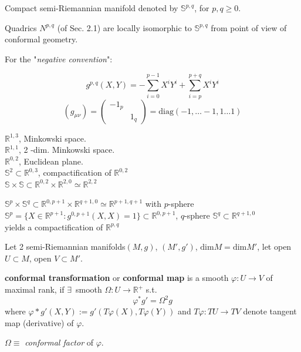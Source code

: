 Compact semi-Riemannian manifold denoted by $\mathbb{S}^{p,q}$, for $p, q\geq 0$.

Quadrics $N^{p,q}$ (of Sec. 2.1) are locally isomorphic to $\mathbb{S}^{p,q}$ from point of view of conformal geometry.

For the "\emph{negative convention}": 

\[
g^{p,q}(X,Y) = - \sum_{i=0}^{p-1} X^i Y^i + \sum_{i=p}^{p+q} X^i Y^i
\]
\[
(g_{\mu \nu}) = \left( \begin{matrix} -1_p & \\ & 1_q \end{matrix} \right) = \text{diag}(-1 , \dots - 1, 1 \dots 1)
\]

$\mathbb{R}^{1,3} $, Minkowski space. \\
$\mathbb{R}^{1,1}$, 2 -dim. Minkowski space. \\
$\mathbb{R}^{0,2}$, Euclidean plane. \\
$\mathbb{S}^2 \subset \mathbb{R}^{0,3}$, compactification of $\mathbb{R}^{0,2}$ \\
$\mathbb{S} \times \mathbb{S} \subset \mathbb{R}^{0,2} \times \mathbb{R}^{2,0} \simeq \mathbb{R}^{2,2}$ 

$\mathbb{S}^p \times \mathbb{S}^q \subset \mathbb{R}^{0, p+1} \times \mathbb{R}^{q+1, 0} \simeq \mathbb{R}^{p+1,q+1}$ with $p$-sphere $\mathbb{S}^p = \lbrace X \in \mathbb{R}^{p+1} : g^{ 0, p+1}(X,X) = 1\rbrace \subset \mathbb{R}^{0, p+1}$, $q$-sphere $\mathbb{S}^q \subset \mathbb{R}^{q+1, 0}$ \\
yields a compactification of $\mathbb{R}^{p,q}$ 




\begin{definition}
Let 2 semi-Riemannian manifolds$(M,g)$, $(M',g')$, $\text{dim}M = \text{dim}M'$, let open $U\subset M$, open $V\subset M'$.  

\textbf{conformal transformation} or \textbf{conformal map} is a smooth $\varphi : U\to V$ of maximal rank, if $\exists \, $ smooth $\Omega : U\to \mathbb{R}^+$ s.t. 
\begin{equation}
	\varphi^* g' = \Omega^2 g
\end{equation}
where $\varphi* g'(X,Y) :=g'(T\varphi(X), T\varphi(Y))$ and $T\varphi: TU \to TV$ denote tangent map (derivative) of $\varphi$.  

$\Omega \equiv $ \emph{conformal factor} of $\varphi$.  
\end{definition}


